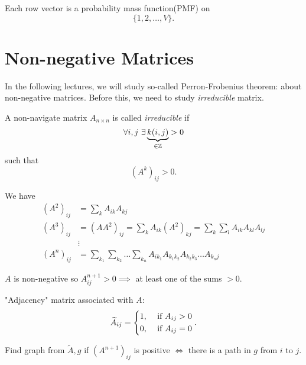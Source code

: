 \begin{remark}
	Each row vector is a probability mass function(PMF) on
	\[
		\{1, 2, \ldots , V\}.
	\]
\end{remark}


\section{Non-negative Matrices}
In the following lectures, we will study so-called Perron-Frobenius theorem: about non-negative matrices. Before this, we need to study
\emph{irreducible} matrix.

\begin{definition}[Irreducible]
	A non-navigate matrix \(A_{n\times n}\) is called \emph{irreducible} if
	\[
		\forall i, j\ \exists \underbrace{k(i, j)}_{\in\mathbb{\MakeUppercase{Z}}}>0
	\]
	such that
	\[
		(A^k)_{ij}>0.
	\]
\end{definition}

We have
\[
	\begin{split}
		(A^2)_{ij} &= \sum\limits_{k} A_{ik}A_{kj}\\
		(A^3)_{ij} &= (A A^2)_{ij} = \sum\limits_{k} A_{ik}(A^2)_{kj} = \sum\limits_{k}\sum\limits_{l} A_{ik} A_{kl}A_{lj}\\
		&\vdots\\
		(A^n)_{ij} &= \sum\limits_{k_1}\sum\limits_{k_2}\ldots \sum\limits_{k_n}A_{ik_1}A_{k_1 k_2}A_{k_2 k_3}\ldots A_{k_n j}
	\end{split}
\]

\(A\) is non-negative so \(A^{n+1}_{ij} > 0\implies \) at least one of the sums \(>0\).

"Adjacency" matrix associated with \(A\):
\[
	\widetilde{A}_{ij} = \begin{dcases}
		1, & \text{ if }A_{ij}>0 \\
		0, & \text{ if }A_{ij}=0 \\
	\end{dcases}.
\]

Find graph from \(\widetilde{A}, g\) if \((A^{n+1})_{ij}\) is positive \(\iff\) there is a path in \(g\) from
\(i\) to \(j\).